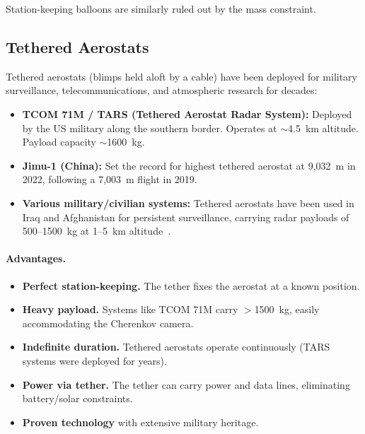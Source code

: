 \documentclass[11pt]{article}
\begin{document}
Station-keeping balloons are similarly ruled out by the mass constraint.


\subsection{Tethered Aerostats}
\label{sec:tethered_option}

Tethered aerostats (blimps held aloft by a cable) have been deployed for
military surveillance, telecommunications, and atmospheric research for
decades:

\begin{itemize}[nosep]
  \item \textbf{TCOM 71M / TARS (Tethered Aerostat Radar System):} Deployed
        by the US military along the southern border.  Operates at
        $\sim$4.5~km altitude.  Payload capacity $\sim$1600~kg.
  \item \textbf{Jimu-1 (China):}  Set the record for highest tethered
        aerostat at 9,032~m in 2022, following a 7,003~m flight in 2019.
  \item \textbf{Various military/civilian systems:} Tethered aerostats have
        been used in Iraq and Afghanistan for persistent surveillance,
        carrying radar payloads of 500--1500~kg at 1--5~km
        altitude~\cite{Davidson2012}.
\end{itemize}

\paragraph{Advantages.}
\begin{itemize}[nosep]
  \item \textbf{Perfect station-keeping.}  The tether fixes the aerostat
        at a known position.
  \item \textbf{Heavy payload.}  Systems like TCOM 71M carry $>$1500~kg,
        easily accommodating the Cherenkov camera.
  \item \textbf{Indefinite duration.}  Tethered aerostats operate
        continuously (TARS systems were deployed for years).
  \item \textbf{Power via tether.}  The tether can carry power and data
        lines, eliminating battery/solar constraints.
  \item \textbf{Proven technology} with extensive military heritage.
\end{itemize}
\end{document}
